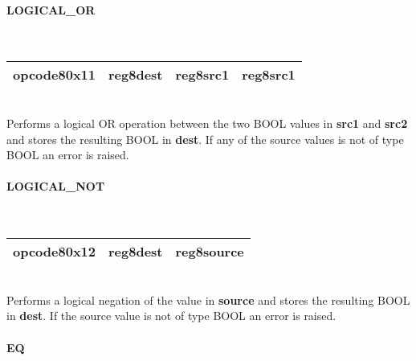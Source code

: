 \documentclass[12pt,a4paper]{article}
\begin{document}
\vspace{2em}\begin{minipage}{\textwidth}
\paragraph{LOGICAL\_OR}
~\vspace{1em}\\\begin{tabular}{|p{2cm}|p{2cm}|p{2cm}|p{2cm}|}
\hline
opcode8\newline\textbf{0x11} & reg8\newline\textbf{dest} &
reg8\newline\textbf{src1} & reg8\newline\textbf{src1} \\
\hline
\end{tabular}\vspace{1em}\\
Performs a logical OR operation between the two BOOL values in \textbf{src1}
and \textbf{src2} and stores the resulting BOOL in \textbf{dest}. If any of the
source values is not of type BOOL an error is raised.
\end{minipage}

\vspace{2em}\begin{minipage}{\textwidth}
\paragraph{LOGICAL\_NOT}
~\vspace{1em}\\\begin{tabular}{|p{2cm}|p{2cm}|p{2cm}|}
\hline
opcode8\newline\textbf{0x12} & reg8\newline\textbf{dest} & reg8\newline\textbf{source} \\
\hline
\end{tabular}\vspace{1em}\\
Performs a logical negation of the value in \textbf{source} and stores the
resulting BOOL in \textbf{dest}. If the source value is not of type BOOL an error is raised.
\end{minipage}

\vspace{2em}\begin{minipage}{\textwidth}
\paragraph{EQ}
\end{minipage}
\end{document}
